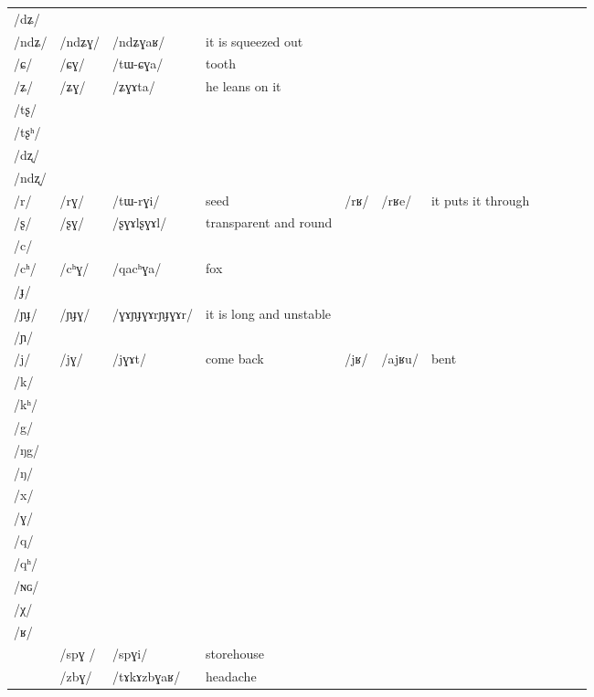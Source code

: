 \documentclass[oldfontcommands,oneside,a4paper,11pt]{article}
\newcommand{\ipa}[1]{/#1/} %
\newcommand{\deux}[1]{/#1/}
\newcommand{\trois}[1]{/#1/}
\newcommand{\idph}[1]{\cellcolor{gray}\textbf{#1}}
\begin{document}
\begin{table}
{\begin{tabular}{l|lll|lll|lll|l}
\ipa{dʑ}  	&    	&    	&  	&	&	& \\	
\ipa{ndʑ}  	&  \deux{ndʑɣ}  	&  \ipa{ndʑɣaʁ}  	&  it is squeezed out	&	&	& \\	
\ipa{ɕ}  	&  \deux{ɕɣ}  	&  \ipa{tɯ-ɕɣa}  	&  tooth	&	&	& \\	
\ipa{ʑ}  	&  \deux{ʑɣ}  	&  \ipa{ʑɣɤta}  	& he leans on it 	&	&	& \\	
\ipa{tʂ}  	&    	&    	&  	&	&	& \\	
\ipa{tʂʰ}  	&    	&    	&  	&	&	& \\	
\ipa{dʐ}  	&    	&    	&  	&	&	& \\	
\ipa{ndʐ}  	&    	&    	&  	&	&	& \\	
\ipa{r}  	&  \deux{rɣ}  	&  \ipa{tɯ-rɣi}  	&  seed	&\deux{rʁ}	&\ipa{rʁe}	& it puts it through\\	
\ipa{ʂ}  	&  \deux{ʂɣ} \idph{} 	&  \ipa{ʂɣɤlʂɣɤl}  	& transparent and round	&	&	& \\	
\ipa{c}  	&    	&    	&  	&	&	& \\	
\ipa{cʰ}  	&  \deux{cʰɣ}  	&  \ipa{qacʰɣa}  	&fox  	&	&	& \\	
\ipa{ɟ}  	&    	&    	&  	&	&	& \\	
\ipa{ɲɟ}  	&  \deux{ɲɟɣ} \idph{} 	&  \ipa{ɣɤɲɟɣɤrɲɟɣɤr}  	&  it is long and unstable	&	&	& \\	
\ipa{ɲ}  	&    	&    	&  	&	&	& \\	
\ipa{j}  	&  \deux{jɣ}  	&  \ipa{jɣɤt}  	&come back  	&\deux{jʁ}	&\ipa{ajʁu}	&bent \\	
\ipa{k}  	&    	&    	&  	&	&	& \\	
\ipa{kʰ}  	&    	&    	&  	&	&	& \\	
\ipa{g}  	&    	&    	&  	&	&	& \\	
\ipa{ŋg}  	&    	&    	&  	&	&	& \\	
\ipa{ŋ}  	&    	&    	&  	&	&	& \\	
\ipa{x}  	&    	&    	&  	&	&	& \\	
\ipa{ɣ}  	&    	&    	&  	&	&	& \\	
\ipa{q}  	&    	&    	&  	&	&	& \\	
\ipa{qʰ}  	&    	&    	&  	&	&	& \\	
\ipa{ɴɢ}  	&    	&    	&  	&	&	& \\	
\ipa{χ}  	&    	&    	&  	&	&	& \\	
\ipa{ʁ}  	&    	&    	&  	&	&	& \\	
\midrule						
	&\trois{spɣ }  	&\ipa{spɣi}  	&storehouse	&	&	&\\
	&\trois{zbɣ}  	&\ipa{tɤkɤzbɣaʁ}  	&headache	&	&	&\\

\end{tabular}}
\end{table}
\end{document}
